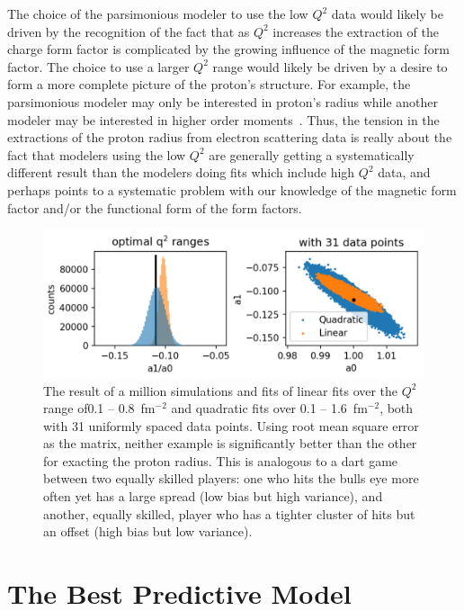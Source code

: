 \documentclass[10pt,aps,prc,twocolumn]{revtex4-1}
\begin{document}
The choice of the parsimonious modeler to use the low $Q^2$ data would likely be 
driven by the recognition of the fact that as $Q^2$ increases
the extraction of the charge form factor is complicated by the growing influence of the magnetic 
form factor.   The choice to use a larger $Q^2$ range would likely be driven by a desire 
to form a more complete picture of the proton's structure.
For example, the parsimonious modeler may only be interested in proton's radius while another 
modeler may be interested in higher order moments~\cite{Alarcon:2017lhg}.
Thus, the tension in the extractions of the proton radius from electron scattering data is really 
about the fact that modelers using the low $Q^2$ are generally getting a systematically different 
result than the modelers doing fits which include high $Q^2$ data, and perhaps points to a systematic 
problem with our knowledge of the magnetic form factor and/or the functional form of the
form factors.

\begin{figure}
\includegraphics[width=\columnwidth]{Figure/zoptimized.png}
\caption{The result of a million simulations and fits of linear fits over the $Q^2$ range 
of0.1 -- 0.8~fm$^{-2}$ and quadratic fits over 0.1 -- 1.6~fm$^{-2}$, both with 31 uniformly spaced data points.    Using root mean
square error as the matrix, neither example is significantly better than the other for exacting the proton
radius.   This is analogous to a dart game between two equally skilled players: one who hits the bulls eye more 
often yet has a large spread (low bias but high variance), and another, equally skilled, player who has a 
tighter cluster of hits but an offset (high bias but low variance).}
\label{zoptimized}
\end{figure}

\section{The Best Predictive Model}
\end{document}
